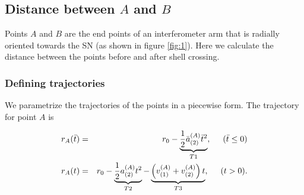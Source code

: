 \documentclass[aps,showpacs,onecolumn,floats,prd,superscriptaddress,nofootinbib]{revtex4-1}
\begin{document}
\subsection{Distance between $A$ and $B$}

Points $A$ and $B$ are the end points of an interferometer arm that is radially oriented towards the SN (as shown in figure \ref{fig:1}). Here we calculate the distance between the points before and after shell crossing.

\subsubsection{Defining trajectories}

We parametrize the trajectories of the points in a piecewise form. 
The trajectory for point $A$ is


\begin{eqnarray}
	r_A(\bar{t}) & = & r_0 - \underbrace{\frac{1}{2} \bar{a}_{(2)}^{(A)} \bar{t}^2}_{T1}, \hspace{5mm} (\bar{t} \leq 0)	\nonumber	\\
	r_A(t) & = & r_0 - \underbrace{\frac{1}{2} a^{(A)}_{(2)} t^2}_{T2} - \underbrace{\left(v^{(A)}_{(1)} + v^{(A)}_{(2)} \right)t}_{T3},  \hspace{5mm} (t>0)  \label{rA}.
\end{eqnarray}
\end{document}
